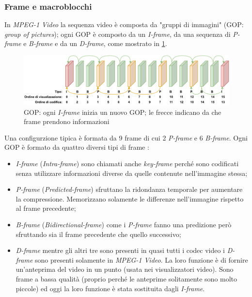 \subsubsection{Frame e macroblocchi}
In \textit{MPEG-1 Video} la sequenza video è composta da "gruppi di immagini" (GOP: \textit{group of pictures}); ogni GOP è composto da un \textit{I-frame}, da una sequenza di \textit{P-frame} e \textit{B-frame} e da un \textit{D-frame}, come mostrato in \ref{fig:gop}.

\begin{figure}[H]
	\includegraphics[width=\linewidth]{immagini/gop}
	\caption{GOP: ogni \textit{I-frame} inizia un nuovo GOP; le frecce indicano da che frame prendono informazioni}
	\label{fig:gop}
\end{figure}

Una configurzione tipica è formata da 9 frame di cui 2 \textit{P-frame} e 6 \textit{B-frame}. Ogni GOP è formato da quattro diversi tipi di frame \parencite{VideoAndMultimediaTransmissionsOverCellularNetworks}:

\begin{itemize}
	\item \textit{I-frame} (\textit{Intra-frame}) sono chiamati anche \textit{key-frame} perché sono codificati senza utilizzare informazioni diverse da quelle contenute nell'immagine stessa;
	\item \textit{P-frame} (\textit{Predicted-frame}) sfruttano la ridondanza temporale per aumentare la compressione. Memorizzano solamente le differenze nell'immagine rispetto al frame precedente;
	\item \textit{B-frame} (\textit{Bidirectional-frame}) come i \textit{P-frame} fanno una predizione però sfruttando sia il frame precedente che quello successivo;
	\item \textit{D-frame} mentre gli altri tre sono presenti in quasi tutti i codec video i \textit{D-frame} sono presenti solamente in \textit{MPEG-1 Video}. La loro funzione è di fornire un'anteprima del video in un punto (usata nei visualizzatori video). Sono frame a bassa qualità (proprio perché le anteprime solitamente sono molto piccole) ed oggi la loro funzione è stata sostituita dagli \textit{I-frame}.
\end{itemize}

